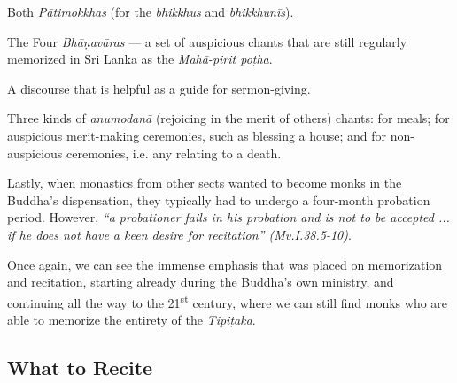 
\ifbfiveversion
\begin{packeditemize}
  \item Both \textit{Pātimokkhas} (for the \textit{bhikkhus} and \textit{bhikkhunīs}).
  \item The Four \textit{Bhāṇavāras} — a set of auspicious chants that are still regularly memorized in Sri Lanka as the \textit{Mahā-pirit poṭha}.
  \item A discourse that is helpful as a guide for sermon-giving.
  \item Three kinds of \textit{anumodanā} (rejoicing in the merit of others) chants: for meals; for auspicious merit-making ceremonies, such as blessing a house; and for non-auspicious ceremonies, i.e. any relating to a death.
\end{packeditemize}
\fi

Lastly, when monastics from other sects wanted to become monks in the Buddha's dispensation, they typically had to undergo a four-month probation period. However, \textit{``a probationer fails in his probation and is not to be accepted ... if he does not have a keen desire for recitation'' (Mv.I.38.5-10)}.

Once again, we can see the immense emphasis that was placed on memorization and recitation, starting already during the Buddha's own ministry, and continuing all the way to the 21\textsuperscript{st} century, where we can still find monks who are able to memorize the entirety of the \textit{Tipiṭaka}.

\subsection*{What to Recite}

